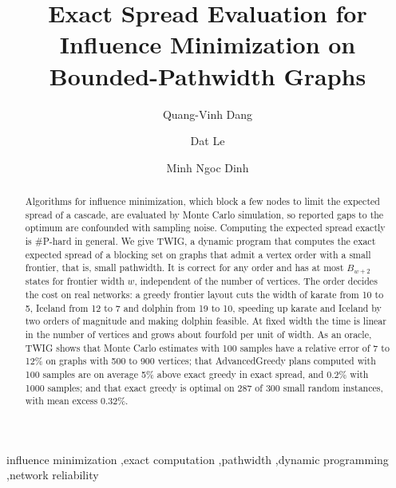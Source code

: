 \documentclass[preprint,11pt]{elsarticle}
\theoremstyle{definition}
\theoremstyle{remark}
\begin{document}
\begin{frontmatter}
\title{Exact Spread Evaluation for Influence Minimization on Bounded-Pathwidth Graphs}
\author[a]{Quang-Vinh Dang}
\author[b]{Dat Le}
\author[c]{Minh Ngoc Dinh}

\begin{abstract}
Algorithms for influence minimization, which block a few nodes to limit the expected spread of a cascade, are evaluated by Monte Carlo simulation, so reported gaps to the optimum are confounded with sampling noise. Computing the expected spread exactly is \#P-hard in general. We give TWIG, a dynamic program that computes the exact expected spread of a blocking set on graphs that admit a vertex order with a small frontier, that is, small pathwidth. It is correct for any order and has at most $B_{w+2}$ states for frontier width $w$, independent of the number of vertices. The order decides the cost on real networks: a greedy frontier layout cuts the width of karate from 10 to 5, Iceland from 12 to 7 and dolphin from 19 to 10, speeding up karate and Iceland by two orders of magnitude and making dolphin feasible. At fixed width the time is linear in the number of vertices and grows about fourfold per unit of width. As an oracle, TWIG shows that Monte Carlo estimates with 100 samples have a relative error of 7 to 12\% on graphs with 500 to 900 vertices; that AdvancedGreedy plans computed with 100 samples are on average 5\% above exact greedy in exact spread, and 0.2\% with 1000 samples; and that exact greedy is optimal on 287 of 300 small random instances, with mean excess 0.32\%.
\end{abstract}

\begin{keyword}
influence minimization \sep exact computation \sep pathwidth \sep dynamic programming \sep network reliability
\end{keyword}
\end{frontmatter}
\end{document}
